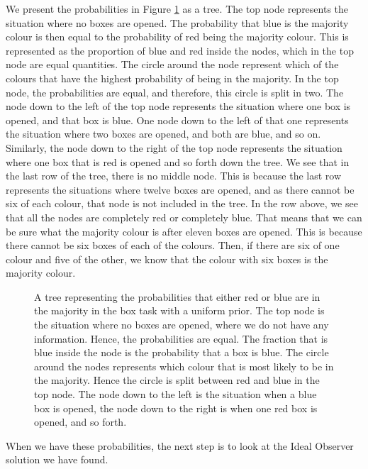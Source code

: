 We present the probabilities in Figure \ref{fig:probability_gamma_kappa_1} as a tree. The top node represents the situation where no boxes are opened. The probability that blue is the majority colour is then equal to the probability of red being the majority colour. This is represented as the proportion of blue and red inside the nodes, which in the top node are equal quantities. The circle around the node represent which of the colours that have the highest probability of being in the majority. In the top node, the probabilities are equal, and therefore, this circle is split in two. The node down to the left of the top node represents the situation where one box is opened, and that box is blue. One node down to the left of that one represents the situation where two boxes are opened, and both are blue, and so on. Similarly, the node down to the right of the top node represents the situation where one box that is red is opened and so forth down the tree. We see that in the last row of the tree, there is no middle node. This is because the last row represents the situations where twelve boxes are opened, and as there cannot be six of each colour, that node is not included in the tree. In the row above, we see that all the nodes are completely red or completely blue. That means that we can be sure what the majority colour is after eleven boxes are opened. This is because there cannot be six boxes of each of the colours. Then, if there are six of one colour and five of the other, we know that the colour with six boxes is the majority colour. 
\begin{figure}
    \centering
    \scalebox{0.4}{}
    \caption[The probabilities of majority colour. $\gamma=\kappa=1$]{A tree representing the probabilities that either red or blue are in the majority in the box task with a uniform prior. The top node is the situation where no boxes are opened, where we do not have any information. Hence, the probabilities are equal. The fraction that is blue inside the node is the probability that a box is blue. The circle around the nodes represents which colour that is most likely to be in the majority. Hence the circle is split between red and blue in the top node. The node down to the left is the situation when a blue box is opened, the node down to the right is when one red box is opened, and so forth.}
    \label{fig:probability_gamma_kappa_1}
\end{figure}

When we have these probabilities, the next step is to look at the Ideal Observer solution we have found.




